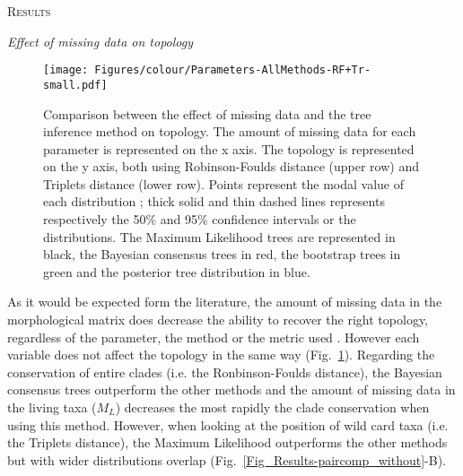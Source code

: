\documentclass[12pt,letterpaper]{article}
\renewcommand{\section}[1]{%
\bigskip
\begin{center}
\begin{Large}
\normalfont\scshape #1
\medskip
\end{Large}
\end{center}}
\renewcommand{\subsection}[1]{%
\bigskip
\begin{center}
\begin{large}
\normalfont\itshape #1
\end{large}
\end{center}}
\begin{document}
%
%

\section{Results}

\subsection{Effect of missing data on topology}

\begin{figure} 
\centering
    \texttt{[image: Figures/colour/Parameters-AllMethods-RF+Tr-small.pdf]}
\caption{Comparison between the effect of missing data and the tree inference method on topology. The amount of missing data for each parameter is represented on the x axis. The topology is represented on the y axis, both using Robinson-Foulds distance (upper row) and Triplets distance (lower row). Points represent the modal value of each distribution ; thick solid and thin dashed lines represents respectively the 50\% and 95\% confidence intervals or the distributions. The Maximum Likelihood trees are represented in black, the Bayesian consensus trees in red, the bootstrap trees in green and the posterior tree distribution in blue.}
\label{Fig_Results-permeth_perparam} %
\end{figure}

As it would be expected form the literature, the amount of missing data in the morphological matrix does decrease the ability to recover the right topology, regardless of the parameter, the method or the metric used \citep[e.g.][]{rouresite-specific2011,sansomfossilization2013,pattinsonphylogeny2014}. However each variable does not affect the topology in the same way (Fig.~\ref{Fig_Results-permeth_perparam}). Regarding the conservation of entire clades (i.e. the Ronbinson-Foulds distance), the Bayesian consensus trees outperform the other methods and the amount of missing data in the living taxa ($M_{L}$) decreases the most rapidly the clade conservation when using this method. However, when looking at the position of wild card taxa (i.e. the Triplets distance), the Maximum Likelihood outperforms the other methods but with wider distributions overlap (Fig.~\ref{Fig_Results-paircomp_without}-B).
\end{document}

